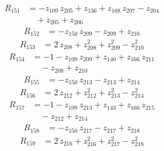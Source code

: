 \begin{equation*}\begin{aligned}
R_{151}&=-z_{109}\,z_{205} +z_{136} +z_{168}\,z_{207} -z_{204} \\
&\quad +z_{205} +z_{206}
\end{aligned}\end{equation*}
\begin{equation*}\begin{aligned}
R_{152}&=-z_{150}\,z_{209} -z_{209} +z_{210}
\end{aligned}\end{equation*}
\begin{equation*}\begin{aligned}
R_{153}&=2\,z_{208} +z_{208}^{2} +z_{209}^{2} -z_{210}^{2}
\end{aligned}\end{equation*}
\begin{equation*}\begin{aligned}
R_{154}&=-1 -z_{109}\,z_{209} +z_{140} +z_{166}\,z_{211} \\
&\quad -z_{208} +z_{210}
\end{aligned}\end{equation*}
\begin{equation*}\begin{aligned}
R_{155}&=-z_{150}\,z_{213} -z_{213} +z_{214}
\end{aligned}\end{equation*}
\begin{equation*}\begin{aligned}
R_{156}&=2\,z_{212} +z_{212}^{2} +z_{213}^{2} -z_{214}^{2}
\end{aligned}\end{equation*}
\begin{equation*}\begin{aligned}
R_{157}&=-1 -z_{109}\,z_{213} +z_{143} +z_{166}\,z_{215} \\
&\quad -z_{212} +z_{214}
\end{aligned}\end{equation*}
\begin{equation*}\begin{aligned}
R_{158}&=-z_{150}\,z_{217} -z_{217} +z_{218}
\end{aligned}\end{equation*}
\begin{equation*}\begin{aligned}
R_{159}&=2\,z_{216} +z_{216}^{2} +z_{217}^{2} -z_{218}^{2}
\end{aligned}\end{equation*}
